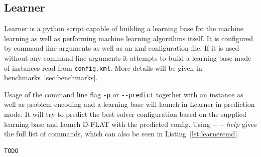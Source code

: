\subsection{Learner}
Learner is a python script capable of building a learning base for the machine learning as well as performing machine learning algorithms itself. It is configured by command line arguments as well as an xml configuration file. If it is used without any command line arguments it attempts to build a learning base made of instances read from \lstinline$config.xml$. More details will be given in benchmarks~\ref{sec:benchmarks}.

Usage of the command line flag \lstinline$-p$ or \lstinline$--predict$ together with an instance as well as problem encoding and a learning base will launch in Learner in prediction mode. It will try to predict the best solver configuration based on the supplied learning base and launch D-FLAT with the predicted config. Using $--help$ gives the full list of commands, which can also be seen in Listing~\ref{lst:learnercmd}.
\begin{lstlisting}[label=lst:learnercmd]
TODO
\end{lstlisting}

